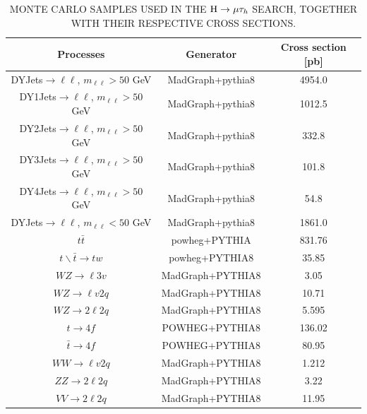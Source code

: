 \begin{table}[!hbpt]
\caption{MONTE CARLO SAMPLES USED IN THE $\mathrm{H}\to \mu\tau_{h}$ SEARCH, TOGETHER WITH THEIR RESPECTIVE CROSS SECTIONS.}
\begin{center}
\begin{tabular}{|c|c|c|}
\hline
Processes & Generator & Cross section [pb] \\\hline
DYJets$\to\ell \ell$, $m_{\ell \ell}>50$ GeV &MadGraph+pythia8   & 4954.0 \\\hline
DY1Jets$\to\ell \ell$, $m_{\ell \ell}>50$ GeV &MadGraph+pythia8 & 1012.5 \\\hline
DY2Jets$\to\ell \ell$, $m_{\ell \ell}>50$ GeV&MadGraph+pythia8  & 332.8 \\\hline
DY3Jets$\to\ell \ell$, $m_{\ell \ell}>50$ GeV&MadGraph+pythia8  & 101.8 \\\hline
DY4Jets$\to\ell \ell$, $m_{\ell \ell}>50$ GeV&MadGraph+pythia8  & 54.8 \\\hline
DYJets$\to\ell \ell$, $m_{\ell \ell}<50$ GeV&MadGraph+pythia8    & 1861.0 \\\hline
$t\bar{t}$                                                     & powheg+PYTHIA     &  831.76\\\hline
$t \backslash \bar{t}\to t w$                        & powheg+PYTHIA8     &  35.85 \\\hline
$WZ \to \ell 3v$                                          & MadGraph+PYTHIA8   &  3.05   \\\hline
$WZ \to \ell v 2q $                                      & MadGraph+PYTHIA8   &  10.71  \\\hline
$WZ \to 2 \ell 2q $                                      &  MadGraph+PYTHIA8  &  5.595 \\\hline
$t\to4f $                                                     & POWHEG+PYTHIA8       & 136.02\\\hline
$\bar{t}\to4f $                                             & POWHEG+PYTHIA8       & 80.95\\\hline
$WW \to \ell v 2q$                                      & MadGraph+PYTHIA8   &  1.212   \\\hline
$ZZ \to 2\ell 2q $                                        & MadGraph+PYTHIA8    &  3.22   \\\hline
$VV \to2\ell 2 q$                                        &  MadGraph+PYTHIA8   &  11.95  \\\hline

\end{tabular}
\end{center}
\label{tab:mutaumcsamples}
\end{table}

